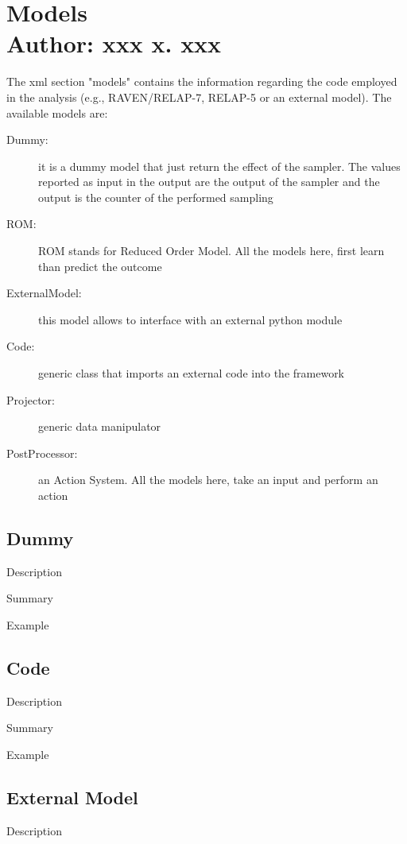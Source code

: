 \section{Models  \\ \vspace{2 mm} {\small Author: xxx x. xxx}}

The xml section "models" contains the information regarding the code employed in the analysis (e.g., RAVEN/RELAP-7, RELAP-5 or an external model).
The available models are:
\begin{description}
\item [Dummy:] it is a dummy model that just return the effect of the sampler. The values reported as input in the output are the output of the sampler and the output is the counter of the performed sampling
\item [ROM:] ROM stands for Reduced Order Model. All the models here, first learn than predict the outcome
\item [ExternalModel:] this model allows to interface with an external python module
\item [Code:] generic class that imports an external code into the framework
\item [Projector:] generic data manipulator
\item [PostProcessor:] an Action System. All the models here, take an input and perform an action
\end{description}

\subsection{Dummy}
\label{sec:models_dummy}

Description

Summary

Example

\subsection{Code}
\label{sec:models_code}

Description

Summary

Example

\subsection{External Model}
\label{sec:models_externalModel}

Description

